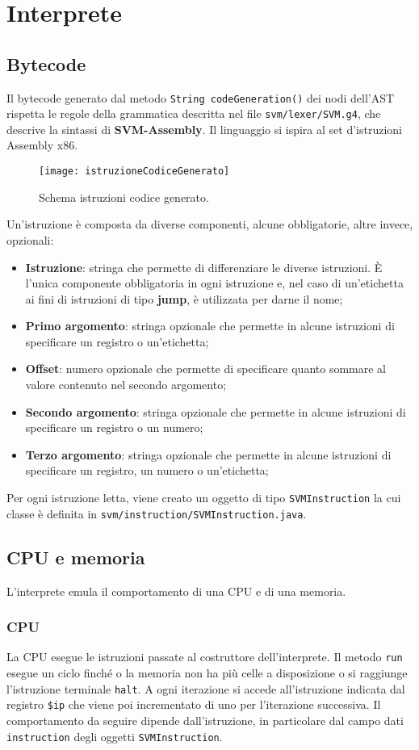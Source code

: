 \documentclass[../report.tex]{subfiles}
\begin{document}
\chapter{Interprete}\label{c:interprete}
\section{Bytecode}\label{s:bytecode}
Il bytecode generato dal metodo \verb|String codeGeneration()| dei nodi dell'AST rispetta le regole della grammatica descritta nel file \verb|svm/lexer/SVM.g4|, che descrive la sintassi di \textbf{SVM-Assembly}. Il linguaggio si ispira al set d'istruzioni Assembly x86. 
\begin{figure}[H]
    \centering
    \texttt{[image: istruzioneCodiceGenerato]}
    \caption{Schema istruzioni codice generato.}
    \label{fig:istruzione-codice-generato}
\end{figure}
\noindent
Un'istruzione \`e composta da diverse componenti, alcune obbligatorie, altre invece, opzionali:
\begin{itemize}
    \item \textbf{Istruzione}: stringa che permette di differenziare le diverse istruzioni. \`E l'unica componente obbligatoria in ogni istruzione e, nel caso di un'etichetta ai fini di istruzioni di tipo \textbf{jump}, \`e utilizzata per darne il nome;
    \item \textbf{Primo argomento}: stringa opzionale che permette in alcune istruzioni di specificare un registro o un'etichetta;
    \item \textbf{Offset}: numero opzionale che permette di specificare quanto sommare al valore contenuto nel secondo argomento;
    \item \textbf{Secondo argomento}: stringa opzionale che permette in alcune istruzioni di specificare un registro o un numero;
    \item \textbf{Terzo argomento}: stringa opzionale che permette in alcune istruzioni di specificare un registro, un numero o un'etichetta;
\end{itemize}
Per ogni istruzione letta, viene creato un oggetto di tipo \verb|SVMInstruction| la cui classe \`e definita in \verb|svm/instruction/SVMInstruction.java|.
\section{CPU e memoria}\label{s:cpu-e-memoria}
L'interprete emula il comportamento di una CPU e di una memoria.
\subsection{CPU}\label{ss:cpu}
La CPU esegue le istruzioni passate al costruttore dell'interprete. Il metodo \verb|run| esegue un ciclo finch\'e o la memoria non ha pi\`u celle a disposizione o si raggiunge l'istruzione terminale \verb|halt|. A ogni iterazione si accede all'istruzione indicata dal registro \verb|$ip| che viene poi incrementato di uno per l'iterazione successiva. Il comportamento da seguire dipende dall'istruzione, in particolare dal campo dati \verb|instruction| degli oggetti \verb|SVMInstruction|.
\end{document}
